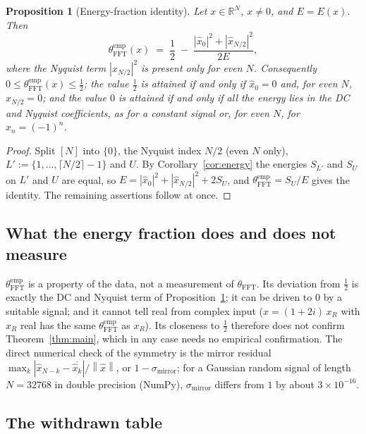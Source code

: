 \documentclass[12pt]{article}
\newtheorem{proposition}[theorem]{Proposition}
\theoremstyle{definition}
\newcommand{\R}{\mathbb{R}}
\newcommand{\norm}[1]{\left\|#1\right\|}
\newcommand{\abs}[1]{\left|#1\right|}
\newcommand{\thetaFFT}{\theta_{\mathrm{FFT}}}
\begin{document}
\begin{proposition}[Energy-fraction identity]\label{prop:energyidentity}
Let $x \in \R^N$, $x \neq 0$, and $E = E(x)$.  Then
\[
  \thetaFFT^{\mathrm{emp}}(x) \;=\; \frac{1}{2} \;-\;
  \frac{\abs{\hat{x}_0}^2 + \abs{\hat{x}_{N/2}}^2}{2E},
\]
where the Nyquist term $\abs{\hat{x}_{N/2}}^2$ is present only for even
$N$.  Consequently $0 \leq \thetaFFT^{\mathrm{emp}}(x) \leq \tfrac{1}{2}$;
the value $\tfrac{1}{2}$ is attained if and only if $\hat{x}_0 = 0$ and,
for even $N$, $\hat{x}_{N/2} = 0$; and the value $0$ is attained if and
only if all the energy lies in the DC and Nyquist coefficients, as for a
constant signal or, for even $N$, for $x_n = (-1)^n$.
\end{proposition}

\begin{proof}
Split $[N]$ into $\{0\}$, the Nyquist index $N/2$ (even $N$ only),
$L' := \{1, \ldots, \lceil N/2 \rceil - 1\}$ and $U$.  By
Corollary~\ref{cor:energy} the energies $S_{L'}$ and $S_U$ on $L'$ and $U$
are equal, so $E = \abs{\hat{x}_0}^2 + \abs{\hat{x}_{N/2}}^2 + 2 S_U$,
and $\thetaFFT^{\mathrm{emp}} = S_U/E$ gives the identity.  The remaining
assertions follow at once.
\end{proof}

\subsection{What the energy fraction does and does not measure}

$\thetaFFT^{\mathrm{emp}}$ is a property of the data, not a measurement
of $\thetaFFT$.  Its deviation from $\tfrac{1}{2}$ is exactly the DC and
Nyquist term of Proposition~\ref{prop:energyidentity}; it can be driven
to $0$ by a suitable signal; and it cannot tell real from complex input
($x = (1+2i)\,x_R$ with $x_R$ real has the same $\thetaFFT^{\mathrm{emp}}$
as $x_R$).  Its closeness to $\tfrac{1}{2}$ therefore does not confirm
Theorem~\ref{thm:main}, which in any case needs no empirical
confirmation.  The direct numerical check of the symmetry is the mirror
residual $\max_k \abs{\hat{x}_{N-k} - \overline{\hat{x}_k}}/\norm{\hat{x}}$,
or $1 - \sigma_{\mathrm{mirror}}$; for a Gaussian random signal of length
$N = 32768$ in double precision (NumPy), $\sigma_{\mathrm{mirror}}$
differs from $1$ by about $3 \times 10^{-16}$.

\subsection{The withdrawn table}
\end{document}
